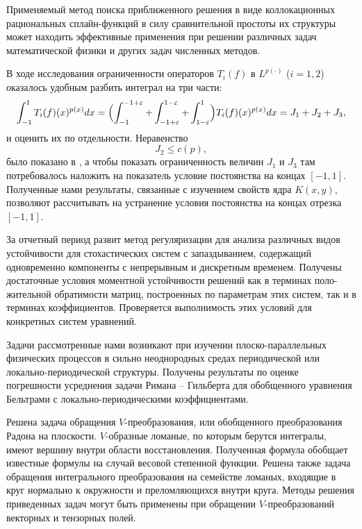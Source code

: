 Применяемый метод поиска приближенного решения в виде
коллокационных рациональных сплайн-функций в силу
сравнительной простоты их структуры
может находить эффективные применения
при решении различных задач математической
физики и других задач численных методов.


В ходе исследования ограниченности операторов $T_i(f)$ в $L^{p(\cdot)}$ ($i=1,2$) оказалось удобным разбить интеграл на три части:
\begin{equation*}
\int_{-1}^1 T_i(f)(x)^{p(x)}dx=\Bigl(\int_{-1}^{-1+\varepsilon} + \int_{-1+\varepsilon}^{1-\varepsilon} + \int_{1-\varepsilon}^{1}\Bigr)T_i(f)(x)^{p(x)}dx=J_1+J_2+J_3,
\end{equation*}
и оценить их по отдельности. Неравенство
$$
J_2\le c(p),
$$
было показано в \cite{tad-SHII-Leg}, а чтобы показать ограниченность величин $J_1$ и $J_3$ там потребовалось наложить на показатель условие постоянства на концах $[-1,1]$. Полученные нами результаты, связанные с изучением свойств ядра $K(x,y)$, позволяют рассчитывать на устранение условия постоянства на концах отрезка $[-1,1]$.

За отчетный период развит метод регуляризации для анализа различных видов устойчивости  для  стохастических систем с запаздыванием, содержащий одновременно компоненты с непрерывным и дискретным временем. Получены  достаточные условия моментной устойчивости решений как в терминах поло-жительной обратимости матриц, построенных по параметрам этих систем, так и в терминах коэффициентов. Проверяется выполнимость этих условий для конкретных систем уравнений.

Задачи рассмотренные нами возникают при изучении плоско-парал\-лельных физических процессов в сильно неоднородных
 средах периодической или локально-периодической структуры.
Получены результаты по оценке погрешности усреднения задачи Римана -- Гильберта для обобщенного уравнения Бельтрами
 с локально-периодическими коэффициентами.
 
 
 
Решена задача обращения $V$-преобразования, или обобщенного преобразования Радона на плоскости. $V$-образные ломаные, по которым берутся интегралы, имеют вершину внутри области восстановления. Полученная формула обобщает известные формулы на случай весовой степенной функции.  Решена также задача обращения интегрального преобразования на семействе ломаных, входящие в круг нормально к окружности и преломляющихся внутри круга.
Методы решения приведенных задач могут быть применены при обращении $V$-преобразований векторных и тензорных полей.
 
